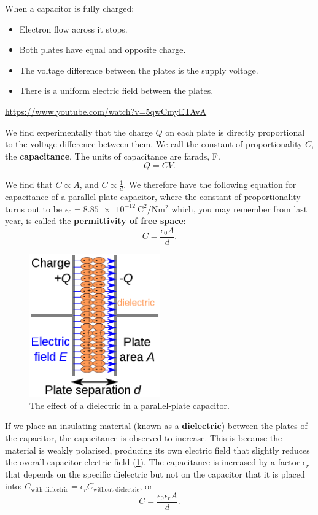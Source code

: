 \documentclass[a4paper]{amsbook}
\newcommand{\goandwatch}[1]{
\begin{center}
\begin{tcolorbox}[width=0.8\textwidth,colback={SkyBlue!20},title={\textbf{Go and watch...}},colbacktitle=MidnightBlue,coltitle=White]
  \textcolor{MidnightBlue}{\url{#1}}
\end{tcolorbox}
\end{center}}
\theoremstyle{definition}
\numberwithin{exercise}{chapter}
\numberwithin{exercise}{chapter}
\begin{document}
When a capacitor is fully charged:
\begin{itemize}
  \item Electron flow across it stops.
  \item Both plates have equal and opposite charge.
  \item The voltage difference between the plates is the supply voltage.
  \item There is a uniform electric field between the plates.
\end{itemize}

\goandwatch{https://www.youtube.com/watch?v=5qwCmyETAvA}

We find experimentally that the charge $ Q $ on each plate is directly proportional to the voltage difference between them. We
call the constant of proportionality $ C $, the \textbf{capacitance}. The units of capacitance are farads, F.
\begin{equation}\label{eq:capvoltage}
  Q = CV.
\end{equation}

We find that $ C \propto A $, and $ C \propto \frac{1}{d} $. We therefore have the following equation for capacitance of a
parallel-plate capacitor, where the constant of proportionality turns out to be $ \epsilon_0 = \SI{8.85e-12}{\coulomb\squared\per\newton\metre\squared} $
which, you may remember from last year, is called the \textbf{permittivity of free space}:
\begin{equation}
  C = \frac{\epsilon_0 A}{d}.
\end{equation}

\begin{figure}
  \centering
  \includegraphics[width=0.5\textwidth]{dielectric}
  \caption{The effect of a dielectric in a parallel-plate capacitor.}\label{fig:dielectric}
\end{figure}
If we place an insulating material (known as a \textbf{dielectric}) between the plates of the capacitor, the capacitance is observed to
increase. This is because the material is weakly polarised, producing its own electric field that slightly reduces the overall capacitor
electric field (\cref{fig:dielectric}). The capacitance is increased by a factor $ \epsilon_r $ that depends on the specific dielectric but not on the
capacitor that it is placed into: $ C_{\text{with dielectric}} = \epsilon_r C_{\text{without dielectric}} $, or
\begin{equation}
  C = \frac{\epsilon_0 \epsilon_r A}{d}.
\end{equation}
\end{document}
